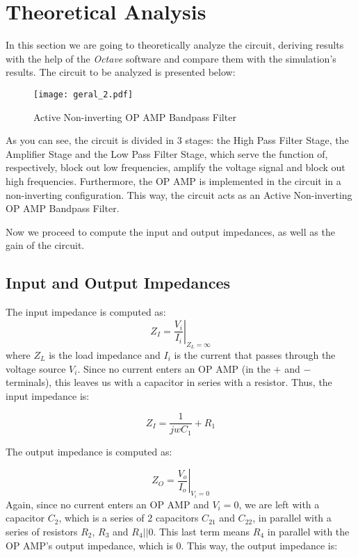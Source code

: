 \section{Theoretical Analysis}
\label{sec:theoretical}

In this section we are going to theoretically analyze the circuit, deriving results with the help of the \textit{Octave} software and compare them with the simulation's results.
The circuit to be analyzed is presented below:

\begin{figure}[H]
\centering
  \texttt{[image: geral\_2.pdf]}
  \caption{Active Non-inverting OP AMP Bandpass Filter}
  \label{fig:geral2}
\end{figure}

As you can see, the circuit is divided in 3 stages: the High Pass Filter Stage, the Amplifier Stage and the Low Pass Filter Stage, which serve the function of, respectively, block out low frequencies, amplify the voltage signal and block out high frequencies.
Furthermore, the OP AMP is implemented in the circuit in a non-inverting configuration. This way, the circuit acts as an Active Non-inverting OP AMP Bandpass Filter.\par
Now we proceed to compute the input and output impedances, as well as the gain of the circuit.

\subsection{Input and Output Impedances}

The input impedance is computed as:
\begin{equation}
Z_{I}=\left.\frac{V_{i}}{I_{i}}\right\vert_{Z_L=\infty}
\end{equation}
where $Z_{L}$ is the load impedance and $I_i$ is the current that passes through the voltage source $V_i$. Since no current enters an OP AMP (in the $+$ and $-$ terminals), this leaves us with a capacitor in series with a resistor.
Thus, the input impedance is:

\begin{equation}
Z_{I}=\frac{1}{jwC_1}+R_1
\end{equation}

The output impedance is computed as:

\begin{equation}
Z_{O}=\left.\frac{V_{o}}{I_{o}}\right\vert_{V_i=0}
\end{equation}
Again, since no current enters an OP AMP and $V_i=0$, we are left with a capacitor $C_2$, which is a series of 2 capacitors $C_{21}$ and $C_{22}$, in parallel with a series of resistors $R_2$, $R_3$ and $R_4||0$. This last term means $R_4$ in parallel with the OP AMP's output impedance, which is 0.
This way, the output impedance is:

